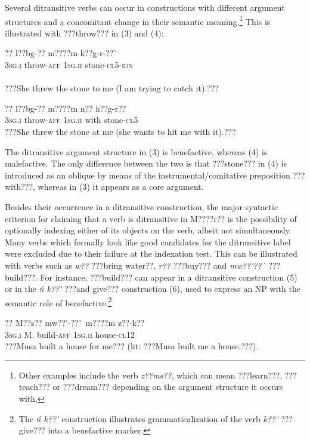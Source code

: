 \documentclass[output=paper]{langsci/langscibook}
\begin{document}
Several ditransitive verbs can occur in constructions with different argument structures and a concomitant change in their semantic meaning.\footnote{ Other examples include the verb \textit{z??ms??}, which can mean ???learn???, ???teach??? or ???dream??? depending on the argument structure it occurs with. } This is illustrated with ???throw??? in (3) and (4):  


\ea 
\gll ??    l??bg-??    m????m    k??g-r-??\`{ }\\
\textsc{3sg.i  }  throw-\textsc{aff}  \textsc{1sg.ii  }  stone-\textsc{cl5-idn}\\
\\\glt???She threw the stone to me (I am trying to catch it).???

\z


\ea \gll 
\label{bkm:Ref446636099}??    l??bg-??    m????m    n??  k??g-r??
\\
%
\textsc{3sg.i  }  throw-\textsc{aff}  \textsc{1sg.ii  }  with  stone-\textsc{cl5}
\\\glt
???She threw the stone at me (she wants to hit me with it).???
\z

The ditransitive argument structure in (3) is benefactive, whereas (4) is malefactive. The only difference between the two is that ???stone??? in (4) is introduced as an oblique by means of the instrumental/comitative preposition ???with???, whereas in (3) it appears as a core argument. 

Besides their occurrence in a ditransitive construction, the major syntactic criterion for claiming that a verb is ditransitive in M????r?? is the possibility of optionally indexing either of its objects on the verb, albeit not simultaneously. Many verbs which formally look like good candidates for the ditransitive label were excluded due to their failure at the indexation test. This can be illustrated with verbs such as \textit{w??} ???bring water??, \textit{r??} ???buy??? and \textit{mw??\'{ }??\`{ }} ???build???. For instance, ???build??? can appear in a ditransitive construction (5) or in the \textit{\'{n} k??\'{ }} ???and give??? construction (6), used to express an NP with the semantic role of benefactive.\footnote{ The\textit{ \'{n} k??\'{ }} construction illustrates grammaticalization of the verb \textit{k??\'{ }} ???give??? into a benefactive marker.} 

\ea \gll 
\label{bkm:Ref446636172}??    M??s??  mw??\'{ }-??\`{ }    m????m    z??-k??
\\
%
\textsc{3sg.i  }  M.  build-\textsc{aff}  \textsc{1sg.ii  }  house-\textsc{cl12}
\\\glt
???Musa built a house for me??? (lit: ???Musa built me a house.???). 
\z
\end{document}
